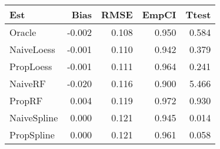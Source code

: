 
\begin{tabular}{lrrrr}
\toprule
Est & Bias & RMSE & EmpCI & Ttest\\
\midrule
Oracle & -0.002 & 0.108 & 0.950 & 0.584\\
NaiveLoess & -0.001 & 0.110 & 0.942 & 0.379\\
PropLoess & -0.001 & 0.111 & 0.964 & 0.241\\
NaiveRF & -0.020 & 0.116 & 0.900 & 5.466\\
PropRF & 0.004 & 0.119 & 0.972 & 0.930\\
NaiveSpline & 0.000 & 0.121 & 0.945 & 0.014\\
PropSpline & 0.000 & 0.121 & 0.961 & 0.058\\
\bottomrule
\end{tabular}